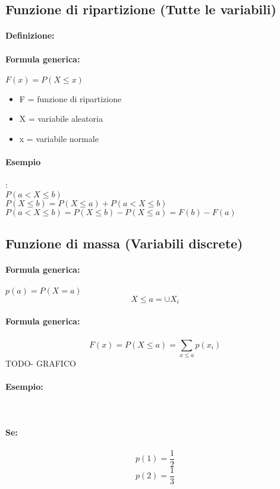 \documentclass[]{article}
\newcommand{\definizione}{\paragraph{Definizione:}}
\newcommand{\formula}{\paragraph{Formula generica:}}
\begin{document}
    \subsection{Funzione di ripartizione (Tutte le variabili)}
    \definizione
    \formula $ F(x) = P(X \leq x) $
    \begin{itemize}
        \item F = funzione di ripartizione
        \item X = variabile aleatoria
        \item x = variabile normale
    \end{itemize}
    
    \paragraph{Esempio}:  \\
    \linebreak[4]
    $ P(a < X \leq b) $ \\
    \linebreak[4]
    $ P(X \leq b) = P(X \leq a) + P(a < X \leq b) $ \\
    \linebreak[4]
    $ P(a < X \leq b) = P(X \leq b) - P(X \leq a) = F(b) - F(a) $
    
  
    \subsection{Funzione di massa (Variabili discrete)}
    \formula $p(a) = P(X = a) $ \\
    \linebreak[4]
    \[ X \leq a = \cup X_i \]
    \formula \[ F(x) = P(X \leq a) = \sum_{x \leq a}^{} p(x_i) \]
    TODO- GRAFICO
    \paragraph{Esempio:}  \\
    \paragraph{Se:}
    \[ p(1) = \frac{1}{2} \]
    \[ p(2) = \frac{1}{3} \]
\end{document}
